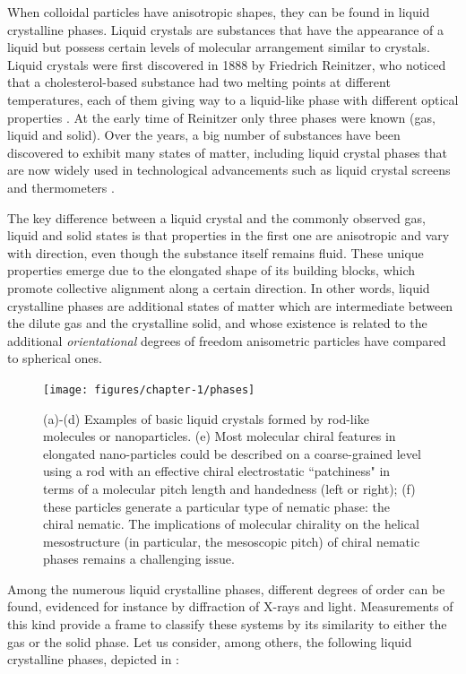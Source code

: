 When colloidal particles have anisotropic shapes, they can be found in liquid crystalline phases. Liquid crystals are substances that have the appearance of a liquid but possess certain levels of molecular arrangement similar to crystals. Liquid crystals were first discovered in 1888 by Friedrich Reinitzer, who noticed that a cholesterol-based substance had two melting points at different temperatures, each of them giving way to a liquid-like phase with different optical properties \cite{reinitzer1888beitrage}. At the early time of Reinitzer only three phases were known (gas, liquid and solid). Over the years, a big number of substances have been discovered to exhibit many states of matter, including liquid crystal phases that are now widely used in technological advancements such as liquid crystal screens and thermometers \cite{Li_2012}.

The key difference between a liquid crystal and the commonly observed gas, liquid and solid states is that properties in the first one are anisotropic and vary with direction, even though the substance itself remains fluid. These unique properties emerge due to the elongated shape of its building blocks, which promote collective alignment along a certain direction. In other words, liquid crystalline phases are additional states of matter which are intermediate between the dilute gas and the crystalline solid, and whose existence is related to the additional {\em orientational} degrees of freedom anisometric particles have compared to spherical ones.

\begin{figure}
\begin{center}
\texttt{[image: figures/chapter-1/phases]}
\caption[Examples of basic liquid crystals formed by rod-like molecules or nanoparticles.]{ \label{introfig1} (a)-(d) Examples of basic liquid crystals formed by rod-like molecules or nanoparticles. (e) Most molecular chiral features in elongated nano-particles  could be described on a coarse-grained level using a rod with an effective chiral electrostatic ``patchiness"  in terms of a molecular pitch length and handedness (left or right); (f) these particles generate a particular type of nematic phase: the chiral nematic. The implications of molecular chirality on the helical mesostructure (in particular, the mesoscopic pitch) of chiral nematic phases remains a challenging issue.}
\end{center}
\end{figure}

Among the numerous liquid crystalline phases, different degrees of order can be found, evidenced for instance by diffraction of X-rays and light. Measurements of this kind provide a frame to classify these systems by its similarity to either the gas or the solid phase. Let us consider, among others, the following liquid crystalline phases, depicted in :

